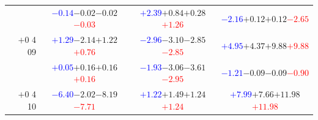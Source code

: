 \documentclass[compress]{beamer}
\begin{document}
\begin{frame}
\begin{tabular}{r | c | c | c}
          & \textcolor{blue}{$-0.14$}\hspace{0.1 cm}$-0.02$\hspace{0.1 cm}$-0.02$\hspace{0.1 cm}\textcolor{red}{$-0.03$} & \textcolor{blue}{$+2.39$}\hspace{0.1 cm}$+0.84$\hspace{0.1 cm}$+0.28$\hspace{0.1 cm}\textcolor{red}{$+1.26$} & \textcolor{blue}{$-2.16$}\hspace{0.1 cm}$+0.12$\hspace{0.1 cm}$+0.12$\hspace{0.1 cm}\textcolor{red}{$-2.65$} \\
$+$0 4 09 & \textcolor{blue}{$+1.29$}\hspace{0.1 cm}$-2.14$\hspace{0.1 cm}$+1.22$\hspace{0.1 cm}\textcolor{red}{$+0.76$} & \textcolor{blue}{$-2.96$}\hspace{0.1 cm}$-3.10$\hspace{0.1 cm}$-2.85$\hspace{0.1 cm}\textcolor{red}{$-2.85$} & \textcolor{blue}{$+4.95$}\hspace{0.1 cm}$+4.37$\hspace{0.1 cm}$+9.88$\hspace{0.1 cm}\textcolor{red}{$+9.88$} \\
          & \textcolor{blue}{$+0.05$}\hspace{0.1 cm}$+0.16$\hspace{0.1 cm}$+0.16$\hspace{0.1 cm}\textcolor{red}{$+0.16$} & \textcolor{blue}{$-1.93$}\hspace{0.1 cm}$-3.06$\hspace{0.1 cm}$-3.61$\hspace{0.1 cm}\textcolor{red}{$-2.95$} & \textcolor{blue}{$-1.21$}\hspace{0.1 cm}$-0.09$\hspace{0.1 cm}$-0.09$\hspace{0.1 cm}\textcolor{red}{$-0.90$} \\
$+$0 4 10 & \textcolor{blue}{$-6.40$}\hspace{0.1 cm}$-2.02$\hspace{0.1 cm}$-8.19$\hspace{0.1 cm}\textcolor{red}{$-7.71$} & \textcolor{blue}{$+1.22$}\hspace{0.1 cm}$+1.49$\hspace{0.1 cm}$+1.24$\hspace{0.1 cm}\textcolor{red}{$+1.24$} & \textcolor{blue}{$+7.99$}\hspace{0.1 cm}$+7.66$\hspace{0.1 cm}$+11.98$\hspace{0.1 cm}\textcolor{red}{$+11.98$} \\

\end{tabular}
\end{frame}
\end{document}
